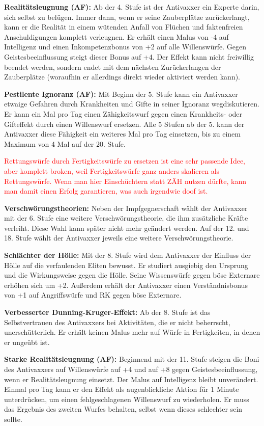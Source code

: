 \documentclass[
	ngerman,
	a4paper,
	10pt,
	twocolumn,
]{scrartcl}
\begin{document}
\textbf{Realitätsleugnung (AF):} Ab der 4. Stufe ist der Antivaxxer ein Experte darin, sich selbst zu belügen. Immer dann, wenn er seine Zauberplätze zurückerlangt, kann er die Realität in einem wütenden Anfall von Flüchen und faktenfreien Anschuldigungen komplett verleugnen. Er erhält einen Malus von -4 auf Intelligenz und einen Inkompetenzbonus von +2 auf alle Willenswürfe. Gegen Geistesbeeinflussung steigt dieser Bonus auf +4. Der Effekt kann nicht freiwillig beendet werden, sondern endet mit dem nächsten Zurückerlangen der Zauberplätze (woraufhin er allerdings direkt wieder aktiviert werden kann).

\textbf{Pestilente Ignoranz (AF):} Mit Beginn der 5. Stufe kann ein Antivaxxer etwaige Gefahren durch Krankheiten und Gifte in seiner Ignoranz wegdiskutieren. Er kann ein Mal pro Tag einen Zähigkeitswurf gegen einen Krankheits- oder Gifteffekt durch einen Willenswurf ersetzen. Alle 5 Stufen ab der 5. kann der Antivaxxer diese Fähigkeit ein weiteres Mal pro Tag einsetzen, bis zu einem Maximum von 4 Mal auf der 20. Stufe.

\textcolor{red}{Rettungswürfe durch Fertigkeitswürfe zu ersetzen ist eine sehr passende Idee, aber komplett broken, weil Fertigkeitswürfe ganz anders skalieren als Rettungswürfe. Wenn man hier Einschüchtern statt ZÄH nutzen dürfte, kann man damit einen Erfolg garantieren, was auch irgendwie doof ist.}

\textbf{Verschwörungstheorien:} Neben der Impfgegnerschaft wählt der Antivaxxer mit der 6. Stufe eine weitere Verschwörungstheorie, die ihm zusätzliche Kräfte verleiht. Diese Wahl kann später nicht mehr geändert werden. Auf der 12. und 18. Stufe wählt der Antivaxxer jeweils eine weitere Verschwörungstheorie.

\textbf{Schlächter der Hölle:} Mit der 8. Stufe wird dem Antivaxxer der Einfluss der Hölle auf die verfaulenden Eliten bewusst. Er studiert ausgiebig den Ursprung und die Wirkungsweise gegen die Hölle. Seine Wissenswürfe gegen böse Externare erhöhen sich um +2. Außerdem erhält der Antivaxxer einen Verständnisbonus von +1 auf Angriffswürfe und RK gegen böse Externare.

\textbf{Verbesserter Dunning-Kruger-Effekt:} Ab der 8. Stufe ist das Selbstvertrauen des Antivaxxers bei Aktivitäten, die er nicht beherrscht, unerschütterlich. Er erhält keinen Malus mehr auf Würfe in Fertigkeiten, in denen er ungeübt ist.

\textbf{Starke Realitätsleugnung (AF):} Beginnend mit der 11. Stufe steigen die Boni des Antivaxxers auf Willenswürfe auf +4 und auf +8 gegen Geistesbeeinflussung, wenn er Realitätsleugnung einsetzt. Der Malus auf Intelligenz bleibt unverändert. Einmal pro Tag kann er den Effekt als augenblickliche Aktion für 1 Minute unterdrücken, um einen fehlgeschlagenen Willenswurf zu wiederholen. Er muss das Ergebnis des zweiten Wurfes behalten, selbst wenn dieses schlechter sein sollte.
\end{document}
